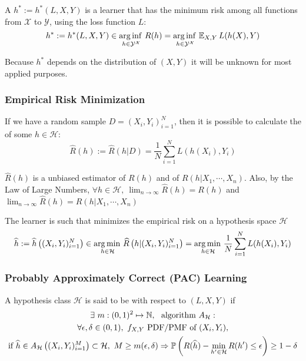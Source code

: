 A  $h^{*}:=h^*(L,X,Y)$ is a learner that has the minimum risk among all functions from $\mathcal{X}$ to $\mathcal{Y}$, using the loss function $L$:
\begin{equation*}
    h^{*}:=h^*(L,X,Y) \in \operatorname*{arg\,inf\,}_{h\in \mathcal{Y}^\mathcal{X}} R(h) = \operatorname*{arg\,inf\,}_{h\in\mathcal{Y}^\mathcal{X}} \operatorname{\mathbb{E}}_{X,Y} L(h(X),Y)
\end{equation*}

Because $h^*$ depends on the distribution of $(X,Y)$ it will be unknown for most applied purposes.

\subsubsection{Empirical Risk Minimization}

If we have a random sample $D=(X_i,Y_i)_{i=1}^N$, then it is possible to calculate the  of some $h\in\mathcal{H}$:
\begin{equation*}
    \widehat{R}(h) := \widehat{R}\left(h|D\right) = \frac{1}{N}\sum_{i=1}^NL(h(X_i),Y_i)
\end{equation*}

$\widehat{R}(h)$ is a unbiased estimator of $R(h)$ and of $R(h|X_1,\cdots, X_n)$. Also, by the Law of Large Numbers, $\forall h\in\mathcal{H},\ \lim_{n\rightarrow\infty}\widehat{R}(h)={R}(h)$ and $\lim_{n\rightarrow\infty}\widehat{R}(h)={R}(h|X_1,\cdots, X_n)$\medskip

The  learner is such that minimizes the empirical risk on a hypothesis space $\mathcal{H}$
\begin{equation*}
    \widehat{h} := \widehat{h}\left((X_i,Y_i)_{i=1}^N\right) \in \operatorname*{arg\,min\,}_{h\in\mathcal{H}}\widehat{R}\left(h|(X_i,Y_i)_{i=1}^N\right) = \operatorname*{arg\,min\,}_{h\in\mathcal{H}} \frac{1}{N}\sum_{i=1}^NL(h(X_i),Y_i)
\end{equation*}

\subsubsection{Probably Approximately Correct (PAC) Learning}
A hypothesis class $\mathcal{H}$ is said to be  with respect to $(L,X,Y)$ if
\begin{multline*}
    \exists\ m:(0,1)^2\mapsto\mathbb{N},\ \text{ algorithm } A_{\mathcal{H}}:\\ \forall \epsilon, \delta\in(0,1),\ f_{X,Y} \text{ PDF/PMF of } (X_i,Y_i), \\
    \text{if } \widehat{h}\in A_{\mathcal{H}}\left((X_i,Y_i)_{i=1}^M\right)\subset\mathcal{H},\ M\geq m(\epsilon,\delta) \Rightarrow 
    \operatorname{\mathbb{P}}\left(R(\widehat{h})-\min_{h'\in\mathcal{H}}R(h')\leq \epsilon \right)\geq 1-\delta
\end{multline*}